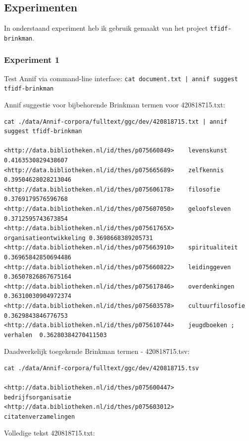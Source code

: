 \documentclass{article}
\begin{document}
\subsection{Experimenten}
In onderstaand experiment heb ik gebruik gemaakt van het project \texttt{tfidf-brinkman}.

\subsubsection{Experiment 1} 

Test Annif via command-line interface: \texttt{cat document.txt | annif suggest tfidf-brinkman}

Annif suggestie voor bijbehorende Brinkman termen voor 420818715.txt:

\begin{lstlisting}
cat ./data/Annif-corpora/fulltext/ggc/dev/420818715.txt | annif suggest tfidf-brinkman

<http://data.bibliotheken.nl/id/thes/p075660849>	levenskunst	0.4163530829438607
<http://data.bibliotheken.nl/id/thes/p075665689>	zelfkennis	0.39504628028213046
<http://data.bibliotheken.nl/id/thes/p075606178>	filosofie	0.3769179576596768
<http://data.bibliotheken.nl/id/thes/p075607050>	geloofsleven	0.3712595743673854
<http://data.bibliotheken.nl/id/thes/p07561765X>	organisatieontwikkeling	0.3698668389205731
<http://data.bibliotheken.nl/id/thes/p075663910>	spiritualiteit	0.36965842850694486
<http://data.bibliotheken.nl/id/thes/p075660822>	leidinggeven	0.36507826867675164
<http://data.bibliotheken.nl/id/thes/p075617846>	overdenkingen	0.36310030904972374
<http://data.bibliotheken.nl/id/thes/p075603578>	cultuurfilosofie	0.3629843846776753
<http://data.bibliotheken.nl/id/thes/p075610744>	jeugdboeken ; verhalen	0.36280384270411503
\end{lstlisting}

Daadwerkelijk toegekende Brinkman termen - 420818715.tsv:

\begin{lstlisting}
cat ./data/Annif-corpora/fulltext/ggc/dev/420818715.tsv

<http://data.bibliotheken.nl/id/thes/p075600447>	bedrijfsorganisatie
<http://data.bibliotheken.nl/id/thes/p075603012>	citatenverzamelingen
\end{lstlisting}


Volledige tekst 420818715.txt:
\end{document}
